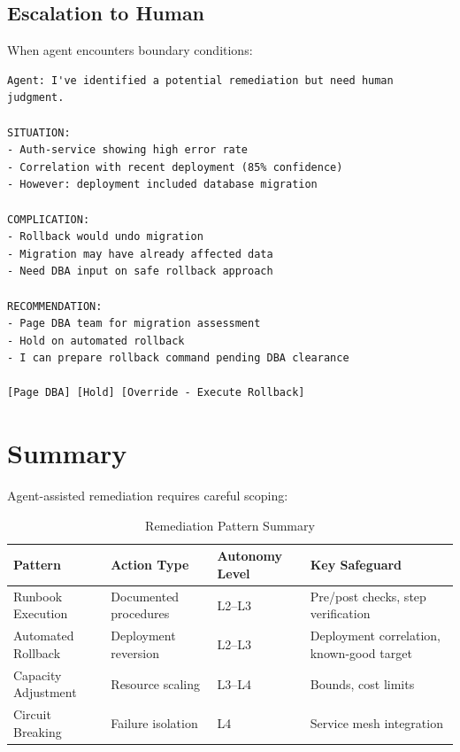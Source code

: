 \subsection{Escalation to Human}
\label{subsec:escalation}

When agent encounters boundary conditions:

\begin{lstlisting}[caption={Agent Escalation Example}]
Agent: I've identified a potential remediation but need human judgment.

SITUATION:
- Auth-service showing high error rate
- Correlation with recent deployment (85% confidence)
- However: deployment included database migration

COMPLICATION:
- Rollback would undo migration
- Migration may have already affected data
- Need DBA input on safe rollback approach

RECOMMENDATION:
- Page DBA team for migration assessment
- Hold on automated rollback
- I can prepare rollback command pending DBA clearance

[Page DBA] [Hold] [Override - Execute Rollback]
\end{lstlisting}

\section{Summary}
\label{sec:remediation-summary}

Agent-assisted remediation requires careful scoping:

\begin{table}[htbp]
\centering
\caption{Remediation Pattern Summary}
\label{tab:remediation-summary}
\begin{tabular}{llll}
\toprule
\textbf{Pattern} & \textbf{Action Type} & \textbf{Autonomy Level} & \textbf{Key Safeguard} \\
\midrule
Runbook Execution & Documented procedures & L2--L3 & Pre/post checks, step verification \\
Automated Rollback & Deployment reversion & L2--L3 & Deployment correlation, known-good target \\
Capacity Adjustment & Resource scaling & L3--L4 & Bounds, cost limits \\
Circuit Breaking & Failure isolation & L4 & Service mesh integration \\
\bottomrule
\end{tabular}
\end{table}

